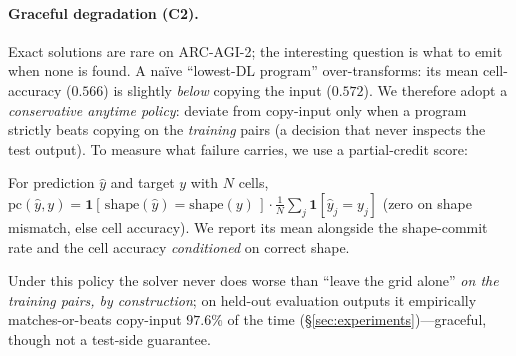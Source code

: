 \paragraph{Graceful degradation (C2).} Exact solutions are rare on ARC-AGI-2; the interesting question is what
to emit when none is found. A na\"ive ``lowest-DL program'' over-transforms: its mean cell-accuracy ($0.566$)
is slightly \emph{below} copying the input ($0.572$). We therefore adopt a \emph{conservative anytime policy}:
deviate from copy-input only when a program strictly beats copying on the \emph{training} pairs (a decision
that never inspects the test output). To measure what failure carries, we use a partial-credit score:
\begin{definition}\label{def:partial}
For prediction $\hat y$ and target $y$ with $N$ cells, $\mathrm{pc}(\hat y,y)=\mathbf 1[\,\mathrm{shape}(\hat
y)=\mathrm{shape}(y)\,]\cdot \tfrac1N\sum_j \mathbf 1[\hat y_j=y_j]$ (zero on shape mismatch, else cell
accuracy). We report its mean alongside the shape-commit rate and the cell accuracy \emph{conditioned} on
correct shape.
\end{definition}
\noindent Under this policy the solver never does worse than ``leave the grid alone'' \emph{on the training
pairs, by construction}; on held-out evaluation outputs it empirically matches-or-beats copy-input $97.6\%$ of
the time (\S\ref{sec:experiments})---graceful, though not a test-side guarantee.


